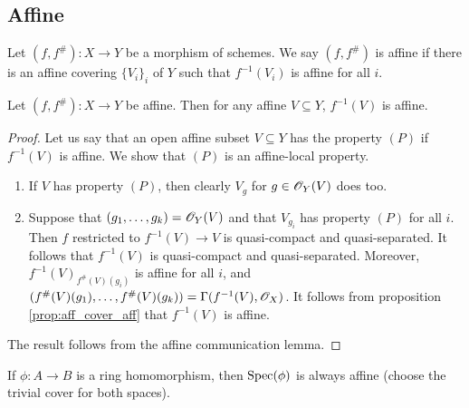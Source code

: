\documentclass{memoir}
\begin{document}
\subsection{Affine}
\begin{definition}
    Let $(f,f^\#):X\to Y$ be a morphism of schemes.
    We say $(f,f^\#)$ is affine if there is an affine covering $\{V_i\}_i$ of $Y$ such that $f^{-1}(V_i)$ is affine for all $i$.
\end{definition}
\begin{thm}
    Let $(f,f^\#):X\to Y$ be affine.
    Then for any affine $V\subseteq Y$, $f^{-1}(V)$ is affine.
\end{thm}
\begin{proof}
    Let us say that an open affine subset $V\subseteq Y$ has the property $(P)$ if $f^{-1}(V)$ is affine.
    We show that $(P)$ is an affine-local property.
    \begin{enumerate}
        \item If $V$ has property $(P)$, then clearly $V_g$ for $g\in\mathscr{O}_Y(V)$ does too.
        \item Suppose that $(g_1,\dots,g_k) = \mathscr{O}_Y(V)$ and that $V_{g_i}$ has property $(P)$ for all $i$.
            Then $f$ restricted to $f^{-1}(V)\to V$ is quasi-compact and quasi-separated.
            It follows that $f^{-1}(V)$ is quasi-compact and quasi-separated.
            Moreover, $f^{-1}(V)_{f^\#(V)(g_i)}$ is affine for all $i$, and $(f^\#(V)(g_1),\dots,f^\#(V)(g_k)) = \Gamma(f^{-1}(V),\mathscr{O}_X)$.
            It follows from proposition \ref{prop:aff_cover_aff} that $f^{-1}(V)$ is affine.
    \end{enumerate}
    The result follows from the affine communication lemma.
\end{proof}
\begin{remark}
    If $\phi:A\to B$ is a ring homomorphism, then $\operatorname{Spec}(\phi)$ is always affine (choose the trivial cover for both spaces).
\end{remark}
\end{document}
